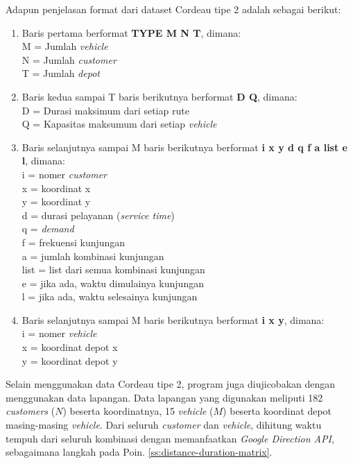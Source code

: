Adapun penjelasan format dari dataset Cordeau tipe 2 adalah sebagai berikut:
\begin{enumerate}
\item Baris pertama berformat \textbf{TYPE M N T}, dimana: \\
M = Jumlah \textit{vehicle} \\
N = Jumlah \textit{customer} \\
T = Jumlah \textit{depot}

\item Baris kedua sampai T baris berikutnya berformat \textbf{D Q}, dimana: \\
D = Durasi maksimum dari setiap rute \\
Q = Kapasitas maksumum dari setiap \textit{vehicle}

\item Baris selanjutnya sampai M baris berikutnya berformat \textbf{i x y d q f a list e l}, dimana: \\
i	= nomer \textit{customer} \\
x	= koordinat x \\
y	= koordinat y \\
d	= durasi pelayanan (\textit{service time}) \\
q	= \textit{demand} \\
f	= frekuensi kunjungan \\
a	= jumlah kombinasi kunjungan \\
list	= list dari semua kombinasi kunjungan \\
e	= jika ada, waktu dimulainya kunjungan \\
l	= jika ada, waktu selesainya kunjungan

\item Baris selanjutnya sampai M baris berikutnya berformat \textbf{i x y}, dimana: \\
i	= nomer \textit{vehicle} \\
x	= koordinat depot x \\
y	= koordinat depot y \\
\end{enumerate}


Selain menggunakan data Cordeau tipe 2, program juga diujicobakan dengan menggunakan data lapangan. Data lapangan yang digunakan meliputi 182 \textit{customers} ($N$) beserta koordinatnya, 15 \textit{vehicle} ($M$) beserta koordinat depot masing-masing \textit{vehicle}. Dari seluruh \textit{customer} dan \textit{vehicle}, dihitung waktu tempuh dari seluruh kombinasi dengan memanfaatkan \textit{Google Direction API}, sebagaimana langkah pada Poin. \ref{ss:distance-duration-matrix}.



